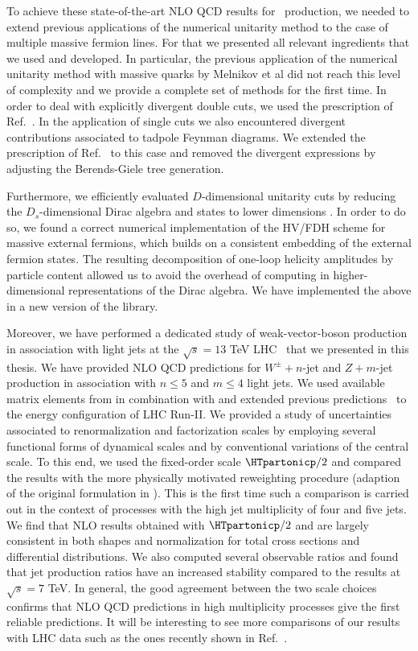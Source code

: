 To achieve these state-of-the-art NLO QCD results for \Wbbn~production, we needed to extend
previous applications of the numerical unitarity method to the case of
multiple massive fermion lines. For that we presented all relevant
ingredients that we used and developed. In particular, the previous application of the numerical unitarity method with massive quarks by Melnikov et al \cite{Ellis:2008ir} did not reach this level of complexity and we provide a complete set of methods for the first time. In order to deal with explicitly
divergent double cuts, we used the prescription of
Ref.~\cite{Ellis:2008ir}. In the application of single cuts we also encountered divergent contributions associated to tadpole Feynman diagrams. We extended the
prescription of Ref.~\cite{Ellis:2008ir} to this case and removed the divergent expressions by adjusting the Berends-Giele tree
generation. 


Furthermore, we efficiently evaluated $D$-dimensional unitarity cuts
by reducing the $D_s$-dimensional Dirac algebra and states to lower
dimensions \cite{angerds}. In order to do so, we found a correct numerical implementation of the HV/FDH scheme for massive external fermions, which builds on a consistent embedding of the external fermion states. The resulting decomposition of one-loop helicity amplitudes by particle content allowed us to avoid the overhead of computing in
higher-dimensional representations of the Dirac algebra. We have implemented the above in a new version of the \BlackHat{} library.


Moreover, we have performed a dedicated study of weak-vector-boson production in
association with light jets at the $\sqrt{s} = 13$ TeV
LHC~\cite{Anger:2017nkq} that we presented in this thesis. We have provided NLO QCD predictions for
$W^\pm+n$-jet and $Z+m$-jet production in association with $n\leq 5$
and $m\leq 4$ light jets. We used available matrix elements from \BlackHat{} \cite{Berger:2008sj} in combination with \SHERPA{} and extended previous predictions~\cite{BH:W5j,BH:Z4j} to the energy configuration of LHC Run-II. We provided a study of uncertainties associated to renormalization
and factorization scales by employing several functional forms of
dynamical scales and by conventional variations of
the central scale. To this end, we used the fixed-order scale $\HTpartonicp/2$ and compared the results with the more
physically motivated \MINLOp{} reweighting procedure (adaption of the original formulation in \cite{MINLO}). This is the first
time such a comparison is carried out in the context of processes with
the high jet multiplicity of four and five jets. We find that NLO results obtained with $\HTpartonicp/2$
and \MINLOp{} are largely consistent in both shapes and normalization for total cross
sections and differential distributions. We also computed several observable ratios and found that jet production ratios have an increased stability compared to the
results at $\sqrt{s} = 7$ TeV. In general,
the good agreement between the two scale choices confirms that NLO
QCD predictions in high multiplicity processes give the first reliable
predictions. It will be interesting to see more comparisons of our results with LHC data such as the ones recently shown in Ref.~\cite{Aaboud:2017hbk}.



